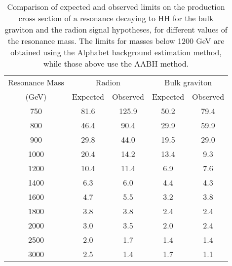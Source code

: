 \begin{table}[h!]
  \begin{center}
    \begin{tabular}{c|c|c|c|c}
      \hline\hline
      Resonance Mass & \multicolumn{2}{c|}{Radion} & \multicolumn{2}{c}{Bulk graviton} \\ \cline{2-5}
      (GeV)          & Expected & Observed & Expected & Observed \\
      \hline\hline
      750  & 81.6 & 125.9 & 50.2 & 79.4\\
      800  & 46.4 & 90.4  & 29.9 & 59.9\\
      900  & 29.8 & 44.0  & 19.5 & 29.0\\
      1000 & 20.4 & 14.2  & 13.4 & 9.3 \\
      1200 & 10.4 & 11.4  & 6.9  & 7.6 \\
      1400 & 6.3  & 6.0   & 4.4  & 4.3 \\
      1600 & 4.7  & 5.5   & 3.2  & 3.8 \\
      1800 & 3.8  & 3.8   & 2.4  & 2.4 \\
      2000 & 3.0  & 3.5   & 2.0  & 2.4 \\
      2500 & 2.0  & 1.7   & 1.4  & 1.4 \\
      3000 & 2.5  & 1.4   & 1.7  & 1.1 \\
      \hline\hline
    \end{tabular}
    \caption{Comparison of expected and observed limits on the production cross section of a resonance decaying to $\mathrm{HH}$ for the bulk graviton and the radion signal hypotheses, for different values of the resonance mass. The limits for masses below 1200 GeV are obtained using the Alphabet background estimation method, while those above use the AABH method.}\label{tab:limits}
  \end{center}
\end{table}


































